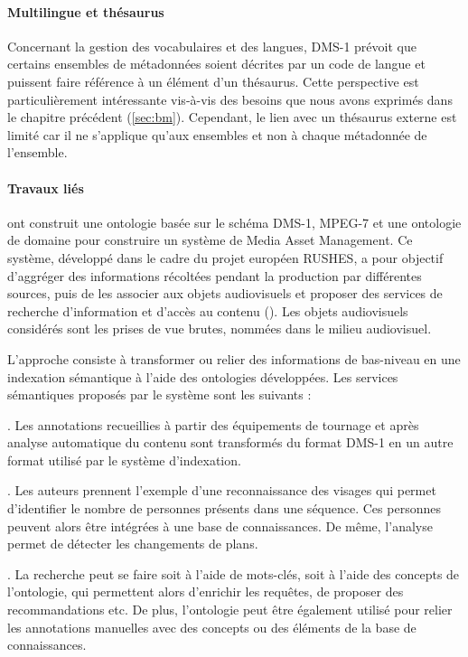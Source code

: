 \paragraph{Multilingue et thésaurus}
Concernant la gestion des vocabulaires et des langues, DMS-1 prévoit que certains ensembles de métadonnées soient décrites par un code de langue et puissent faire référence à un élément d'un thésaurus.
Cette perspective est particulièrement intéressante vis-à-vis des besoins que nous avons exprimés dans le chapitre précédent (\ref{sec:bm}).
Cependant, le lien avec un thésaurus externe est limité car il ne s'applique qu'aux ensembles et non à chaque métadonnée de l'ensemble.

\paragraph{Travaux liés}
\cite{Marcos2009} ont construit une ontologie basée sur le schéma DMS-1, MPEG-7 et une ontologie de domaine pour construire un système de Media Asset Management. 
Ce système, développé dans le cadre du projet européen RUSHES, a pour objectif d'aggréger des informations récoltées pendant la production par différentes sources, puis de les associer aux objets audiovisuels et proposer des services de recherche d'information et d'accès au contenu (\cite{Gorka2008}). 
Les objets audiovisuels considérés sont les prises de vue brutes, nommées  dans le milieu audiovisuel.

L'approche consiste à transformer ou relier des informations de bas-niveau en une indexation sémantique à l'aide des ontologies développées.
Les services sémantiques proposés par le système sont les suivants : 
\begin{liste}
	\item {}. 
	Les annotations recueillies à partir des équipements de tournage et après analyse automatique du contenu sont transformés du format DMS-1 en un autre format utilisé par le système d'indexation.
	\item {}. 
	Les auteurs prennent l'exemple d'une reconnaissance des visages qui permet d'identifier le nombre de personnes présents dans une séquence.
	Ces personnes peuvent alors être intégrées à une base de connaissances.
	De même, l'analyse permet de détecter les changements de plans.
	\item {}. 
	La recherche peut se faire soit à l'aide de mots-clés, soit à l'aide des concepts de l'ontologie, qui permettent alors d'enrichir les requêtes, de proposer des recommandations etc. 
	De plus, l'ontologie peut être également utilisé pour relier les annotations manuelles avec des concepts ou des éléments de la base de connaissances.
\end{liste}

